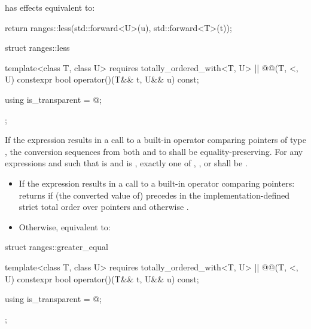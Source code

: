 \begin{itemdescr}
\pnum
{} has effects equivalent to:
\begin{codeblock}
return ranges::less{}(std::forward<U>(u), std::forward<T>(t));
\end{codeblock}
\end{itemdescr}

%
\begin{itemdecl}
struct ranges::less {
  template<class T, class U>
    requires totally_ordered_with<T, U> || @@(T, <, U)
  constexpr bool operator()(T&& t, U&& u) const;

  using is_transparent = @\unspecnc@;
};
\end{itemdecl}

\begin{itemdescr}
\pnum
\expects
If the expression  results in a
call to a built-in operator \tcode{<} comparing pointers of type , the
conversion sequences from both  and  to  shall be
equality-preserving. For any expressions
 and  such that  is  and
 is , exactly one of
,
, or
shall be .

\pnum
\effects
\begin{itemize}
\item
If the expression  results in a
call to a built-in operator \tcode{<} comparing pointers:
returns  if (the converted value of)  precedes  in
the implementation-defined strict total order over pointers
and otherwise .

\item
Otherwise, equivalent to:
\end{itemize}
\end{itemdescr}

%
\begin{itemdecl}
struct ranges::greater_equal {
  template<class T, class U>
    requires totally_ordered_with<T, U> || @@(T, <, U)
  constexpr bool operator()(T&& t, U&& u) const;

  using is_transparent = @\unspecnc@;
};
\end{itemdecl}


